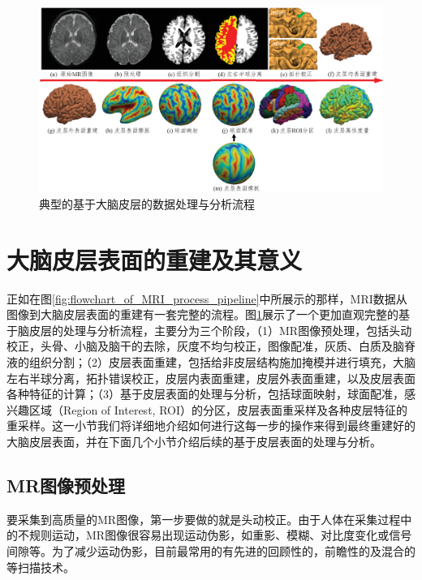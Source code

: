 \begin{figure}[t]
    \centering
    \includegraphics[width=\linewidth]{figure/flowchart_of_surface_based_analysis.eps}
    \caption{\label{fig:flowchart_of_surface_based_analysis}典型的基于大脑皮层的数据处理与分析流程}
\end{figure}


\section{大脑皮层表面的重建及其意义}
正如在图\ref{fig:flowchart_of_MRI_process_pipeline}中所展示的那样，MRI数据从图像到大脑皮层表面的重建有一套完整的流程。图\ref{fig:flowchart_of_surface_based_analysis}展示了一个更加直观完整的基于脑皮层的处理与分析流程，主要分为三个阶段，（1）MR图像预处理，包括头动校正，头骨、小脑及脑干的去除，灰度不均匀校正，图像配准，灰质、白质及脑脊液的组织分割；（2）皮层表面重建，包括给非皮层结构施加掩模并进行填充，大脑左右半球分离，拓扑错误校正，皮层内表面重建，皮层外表面重建，以及皮层表面各种特征的计算；（3）基于皮层表面的处理与分析，包括球面映射，球面配准，感兴趣区域（Region of Interest, ROI）的分区，皮层表面重采样及各种皮层特征的重采样。这一小节我们将详细地介绍如何进行这每一步的操作来得到最终重建好的大脑皮层表面，并在下面几个小节介绍后续的基于皮层表面的处理与分析。

\subsection{MR图像预处理}\label{sec:MR图像预处理}
要采集到高质量的MR图像，第一步要做的就是头动校正\cite{zaitsev2015motion}。由于人体在采集过程中的不规则运动，MR图像很容易出现运动伪影，如重影、模糊、对比度变化或信号间隙等。为了减少运动伪影，目前最常用的有先进的回顾性的\cite{atkinson1999automatic}，前瞻性的\cite{zaitsev2006magnetic}及混合的\cite{aksoy2012hybrid}等扫描技术。

